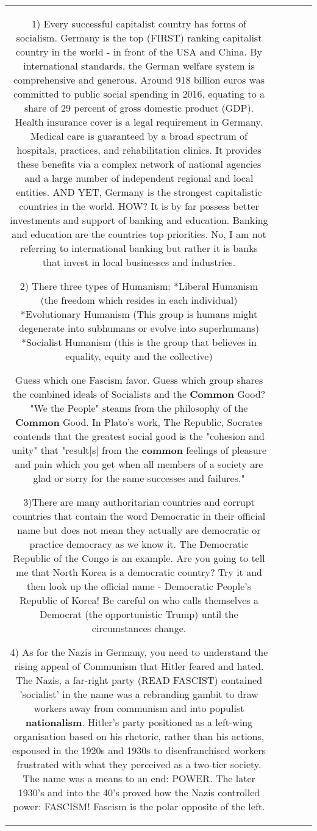 \documentclass[11pt]{article}
\newlength\mylength
\begin{document}
\begin{center}
\begin{longtable}{|C{.65\mylength}|C{.30\mylength}|C{.12\mylength}|C{.12\mylength}|C{.12\mylength}|}
1) Every successful capitalist country has forms of socialism. Germany is the top (FIRST) ranking capitalist country in the world - in front of the USA and China.  By international standards, the German welfare system is comprehensive and generous. Around 918 billion euros was committed to public social spending in 2016, equating to a share of 29 percent of gross domestic product (GDP). Health insurance cover is a legal requirement in Germany. Medical care is guaranteed by a broad spectrum of hospitals, practices, and rehabilitation clinics. It provides these benefits via a complex network of national agencies and a large number of independent regional and local entities. AND YET, Germany is the strongest capitalistic countries in the world. HOW? It is by far possess better investments and support of banking and education. Banking and education are the countries top priorities. No, I am not referring to international banking but rather it is banks that invest in local businesses and industries. 

2) There three types of Humanism:
*Liberal Humanism (the freedom which resides in each individual)
*Evolutionary Humanism (This group is humans might degenerate into subhumans or evolve into superhumans)
*Socialist Humanism  (this is the group that believes in equality, equity and the collective)

Guess which one Fascism favor. Guess which group shares the combined ideals of Socialists and the \textbf{Common} Good?  "We the People" steams from the philosophy of the \textbf{Common} Good. In Plato's work, The Republic,  Socrates contends that the greatest social good is the "cohesion and unity" that "result[s] from the \textbf{common} feelings of pleasure and pain which you get when all members of a society are glad or sorry for the same successes and failures." 

3)There are many authoritarian countries and corrupt countries that contain the word Democratic in their official name but does not mean they actually are democratic or practice democracy as we know it.  The Democratic Republic of the Congo is an example. Are you going to tell me that North Korea is a democratic country? Try it and then look up the official name - Democratic People's Republic of Korea!  Be careful on who calls themselves a Democrat (the opportunistic Trump) until the circumstances change.

4) As for the Nazis in Germany,  you need to understand the rising appeal of Communism that Hitler feared and hated. The Nazis, a far-right party (READ FASCIST) contained 'socialist' in the name was a rebranding gambit to draw workers away from communism and into populist \textbf{nationalism}. Hitler's party positioned as a left-wing organisation based on his rhetoric, rather than his actions, espoused in the 1920s and 1930s to disenfranchised workers frustrated with what they perceived as a two-tier society. The name was a means to an end: POWER. The later 1930's and into the 40's proved how the Nazis controlled power: FASCISM! Fascism is the polar opposite of the left.


\end{longtable}
\end{center}
\end{document}
